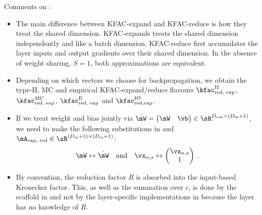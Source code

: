 Comments on :
\begin{itemize}

\item The main difference between KFAC-expand and KFAC-reduce is how they treat the shared dimension.
  KFAC-expands treats the shared dimension independently and like a batch dimension.
  KFAC-reduce first accumulates the layer inputs and output gradients over their shared dimension.
  In the absence of weight sharing, $S=1$, both approximations are equivalent.

\item Depending on which vectors we choose for backpropagation, we obtain the type-II, MC and empirical KFAC-expand/reduce flavours $\kfac_{\text{red, exp}}^{\text{II}}$, $\kfac_{\text{red, exp}}^{\text{MC}}$, $\kfac_{\text{red, exp}}^{\text{E}}$ and $\kfac_{\text{red,exp}}^{\text{IO}}$.

\item If we treat weight and bias jointly via $\tilde{\mW} = \begin{pmatrix} \mW & \vb \end{pmatrix} \in \sR^{D_{\text{out}}\times (D_{\text{in}}+1)} $, we need to make the following substitutions in  and $\mA_{\text{exp, red}} \in \sR^{(D_{\text{in}}+1) \times (D_{\text{in}}+1)}$:
  \begin{align*}
    \mW \leftrightarrow \tilde{\mW}
    \quad
    \text{and}
    \quad
    \vx_{n,s} \leftrightarrow \begin{pmatrix} \vx_{n,s} \\ 1 \end{pmatrix}\,.
  \end{align*}

\item By convention, the reduction factor $R$ is absorbed into the input-based Kronecker factor.
  This, as well as the summation over $c$, is done by the scaffold in  and not by the layer-specific implementations in  because the layer has no knowledge of $R$.
\end{itemize}

